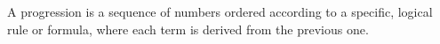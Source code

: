 A progression is a sequence of numbers ordered according to a specific, logical rule or formula, where each term is derived from the previous one.
